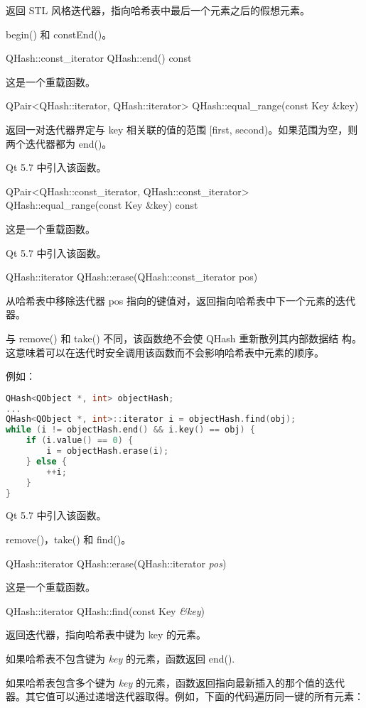 返回 STL 风格迭代器，指向哈希表中最后一个元素之后的假想元素。

\begin{seeAlso}
begin() 和 constEnd()。
\end{seeAlso}

QHash::const\_iterator QHash::end() const

这是一个重载函数。

QPair<QHash::iterator, QHash::iterator> QHash::equal\_range(const Key \&key)

返回一对迭代器界定与 key 相关联的值的范围 [first, second)。如果范围为空，则两个迭代器都为 end()。

Qt 5.7 中引入该函数。

QPair<QHash::const\_iterator, QHash::const\_iterator> QHash::equal\_range(const Key \&key) const

这是一个重载函数。

Qt 5.7 中引入该函数。

QHash::iterator QHash::erase(QHash::const\_iterator pos)

从哈希表中移除迭代器 pos 指向的键值对，返回指向哈希表中下一个元素的迭代器。

与 remove() 和 take() 不同，该函数绝不会使 QHash 重新散列其内部数据结
构。这意味着可以在迭代时安全调用该函数而不会影响哈希表中元素的顺序。

例如：

\begin{lstlisting}[language=C++]
QHash<QObject *, int> objectHash;
...
QHash<QObject *, int>::iterator i = objectHash.find(obj);
while (i != objectHash.end() && i.key() == obj) {
    if (i.value() == 0) {
        i = objectHash.erase(i);
    } else {
        ++i;
    }
}
\end{lstlisting}

Qt 5.7 中引入该函数。

\begin{seeAlso}
remove()，take() 和 find()。
\end{seeAlso}

QHash::iterator QHash::erase(QHash::iterator \emph{pos})

这是一个重载函数。

QHash::iterator QHash::find(const Key \emph{\&key})

返回迭代器，指向哈希表中键为 key 的元素。

如果哈希表不包含键为 \emph{key} 的元素，函数返回 end().

如果哈希表包含多个键为 \emph{key} 的元素，函数返回指向最新插入的那个值的迭代器。其它值可以通过递增迭代器取得。例如，下面的代码遍历同一键的所有元素：


